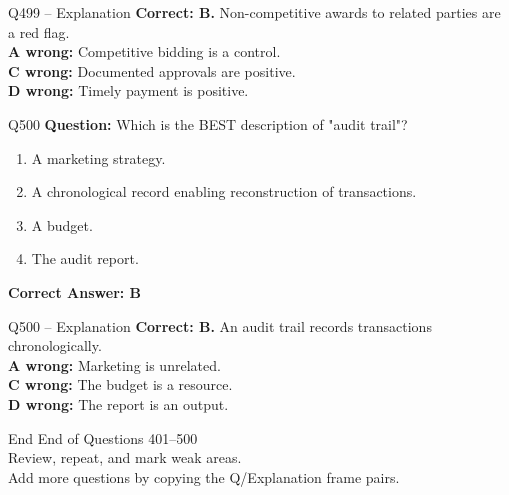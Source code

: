\documentclass[aspectratio=169,10pt]{beamer}
\begin{document}
	\begin{frame}[t]{Q499 -- Explanation}
		\small
		\textbf{Correct: B.} Non-competitive awards to related parties are a red flag. \\[4pt]
		\textbf{A wrong:} Competitive bidding is a control. \\[2pt]
		\textbf{C wrong:} Documented approvals are positive. \\[2pt]
		\textbf{D wrong:} Timely payment is positive.
	\end{frame}
	
	\begin{frame}[t]{Q500}
		\small
		\textbf{Question:} Which is the BEST description of "audit trail"?
		\begin{enumerate}[label=\Alph*.,itemsep=1pt,topsep=2pt]
			\item A marketing strategy.
			\item A chronological record enabling reconstruction of transactions.
			\item A budget.
			\item The audit report.
		\end{enumerate}
		\vspace{4pt}
		\textbf{Correct Answer: B}
	\end{frame}
	
	\begin{frame}[t]{Q500 -- Explanation}
		\small
		\textbf{Correct: B.} An audit trail records transactions chronologically. \\[4pt]
		\textbf{A wrong:} Marketing is unrelated. \\[2pt]
		\textbf{C wrong:} The budget is a resource. \\[2pt]
		\textbf{D wrong:} The report is an output.
	\end{frame}
	
	\begin{frame}{End}
		\centering
		\Large End of Questions 401--500\\[8pt]
		\normalsize Review, repeat, and mark weak areas.\\[4pt]
		\small Add more questions by copying the Q/Explanation frame pairs.
	\end{frame}
	
\end{document}

